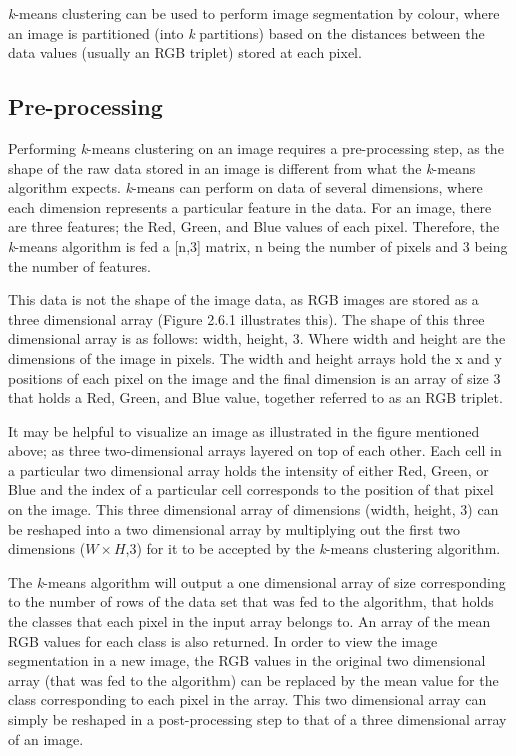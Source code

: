 \documentclass[12pt]{article}
\begin{document}
  \par \textit{k}-means clustering can be used to perform image segmentation by colour, where an image is partitioned (into \textit{k} partitions) based on the distances between the data values (usually an RGB triplet) stored at each pixel.

\subsection {Pre-processing}
  \par Performing \textit{k}-means clustering on an image requires a pre-processing step, as the shape of the raw data stored in an image is different from what the \textit{k}-means algorithm expects. \textit{k}-means can perform on data of several dimensions, where each dimension represents a particular feature in the data. For an image, there are three features; the Red, Green, and Blue values of each pixel. Therefore, the \textit{k}-means algorithm is fed a [n,3] matrix, n being the number of pixels and 3 being the number of features.

  \par This data is not the shape of the image data, as RGB images are stored as a three dimensional array (Figure 2.6.1 illustrates this). The shape of this three dimensional array is as follows: width, height, 3. Where width and height are the dimensions of the image in pixels. The width and height arrays hold the x and y positions of each pixel on the image and the final dimension is an array of size 3 that holds a Red, Green, and Blue value, together referred to as an RGB triplet.

\pagebreak

  \par It may be helpful to visualize an image as illustrated in the figure mentioned above; as three two-dimensional arrays layered on top of each other. Each cell in a particular two dimensional array holds the intensity of either Red, Green, or Blue and the index of a particular cell corresponds to the position of that pixel on the image. This three dimensional array of dimensions (width, height, 3) can be reshaped into a two dimensional array by multiplying out the first two dimensions ($W\times H$,3) for it to be accepted by the \textit{k}-means clustering algorithm.

  \par The \textit{k}-means algorithm will output a one dimensional array of size corresponding to the number of rows of the data set that was fed to the algorithm, that holds the classes that each pixel in the input array belongs to. An array of the mean RGB values for each class is also returned. In order to view the image segmentation in a new image, the RGB values in the original two dimensional array (that was fed to the algorithm) can be replaced by the mean value for the class corresponding to each pixel in the array. This two dimensional array can simply be reshaped in a post-processing step to that of a three dimensional array of an image.
\end{document}
